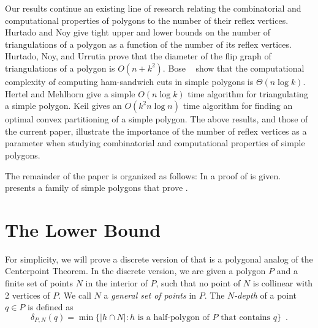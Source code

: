 \documentclass{article}
\begin{document}
Our results continue an existing line of research relating the
combinatorial and computational properties of polygons to the number
of their reflex vertices.   Hurtado and Noy \cite{hn96} give tight
upper and lower bounds on the number of triangulations of a polygon as
a function of the number of its reflex vertices.  Hurtado, Noy, and
Urrutia \cite{hnu99} prove that the diameter of the flip graph of
triangulations of a polygon is $O(n+k^2)$.   Bose \etal\ \cite{geoham}
show that the computational complexity of computing ham-sandwich cuts
in simple polygons is $\Theta(n\log k)$.  Hertel and Mehlhorn
\cite{hm83} give a simple $O(n\log k)$ time algorithm for
triangulating a simple polygon.  Keil \cite{k85} gives an $O(k^2 n\log
n)$ time algorithm for finding an optimal convex partitioning of a
simple polygon.  The above results, and those of the current paper,
illustrate the importance of the number of reflex vertices as a
parameter when studying combinatorial and computational properties of
simple polygons.

The remainder of the paper is organized as follows: In
 a proof of  is given.
 presents a family of simple polygons that prove
.

\section{The Lower Bound}

For simplicity, we will prove a discrete version of
 that is a polygonal analog of the Centerpoint
Theorem.  In the discrete version, we are given a polygon $P$ and a
finite set of points $N$ in the interior of $P$, such that no point of
$N$ is collinear with 2 vertices of $P$.  We call $N$ a \emph{general
set of points} in $P$. The \emph{$N$-depth} of a point $q\in P$ is
defined as 
\[
     \delta_{P,N}(q) = \min\{|h\cap N| : \mbox{$h$ is a half-polygon
	of $P$ that contains $q$} \} \enspace .
\]
\end{document}
